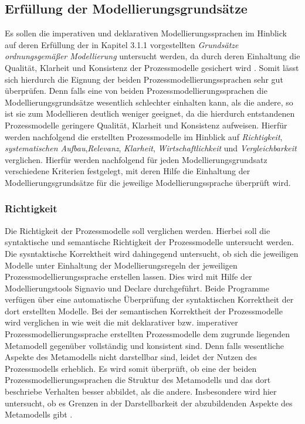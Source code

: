 \subsection{Erfüllung der Modellierungsgrundsätze}
Es sollen die imperativen und deklarativen Modellierungssprachen im Hinblick auf deren Erfüllung der in Kapitel 3.1.1 vorgestellten \textit{Grundsätze ordnungsgemäßer Modellierung} untersucht werden, da durch deren Einhaltung die Qualität, Klarheit und Konsistenz der Prozessmodelle gesichert wird \cite{freund2007}. Somit lässt sich hierdurch die Eignung der beiden Prozessmodellierungssprachen sehr gut überprüfen. Denn falls eine von beiden Prozessmodellierungssprachen die Modellierungsgrundsätze wesentlich schlechter einhalten kann, als die andere, so ist sie zum Modellieren deutlich weniger geeignet, da die hierdurch entstandenen Prozessmodelle geringere Qualität, Klarheit und Konsistenz aufweisen. Hierfür werden nachfolgend die erstellten Prozessmodelle im Hinblick auf \textit{Richtigkeit}, \textit{systematischen Aufbau},\textit{Relevanz}, \textit{Klarheit}, \textit{Wirtschaftlichkeit} und \textit{Vergleichbarkeit} verglichen. Hierfür werden nachfolgend für jeden Modellierungsgrundsatz verschiedene Kriterien festgelegt, mit deren Hilfe die Einhaltung der Modellierungsgrundsätze für die jeweilige Modellierungssprache überprüft wird. \newline

\subsubsection{Richtigkeit}
Die Richtigkeit der Prozessmodelle soll verglichen werden. Hierbei soll die syntaktische und semantische Richtigkeit der Prozessmodelle untersucht werden. \newline
Die sysntaktische Korrektheit wird dahingegend untersucht, ob sich die jeweiligen Modelle unter Einhaltung der Modellierungsregeln der jeweiligen Prozessmodellierungssprache erstellen lassen. Dies wird mit Hilfe der Modellierungstools Signavio und Declare durchgeführt. Beide Programme verfügen über eine automatische Überprüfung der syntaktischen Korrektheit der dort erstellten Modelle. \newline
Bei der semantischen Korrektheit der Prozessmodelle wird verglichen in wie weit die mit deklarativer bzw. imperativer Prozessmodellierungssprache erstellten Prozessmodelle dem zugrunde liegenden Metamodell gegenüber vollständig und konsistent sind. Denn falls wesentliche Aspekte des Metamodells nicht darstellbar sind, leidet der Nutzen des Prozessmodells erheblich. Es wird somit überprüft, ob eine der beiden Prozessmodellierungssprachen die Struktur des Metamodells und das dort beschriebe Verhalten besser abbildet, als die andere. Insbesondere wird hier untersucht, ob es Grenzen in der Darstellbarkeit der abzubildenden Aspekte des Metamodells gibt \cite{journals95, becker2012prozessmanagement}. \newline


